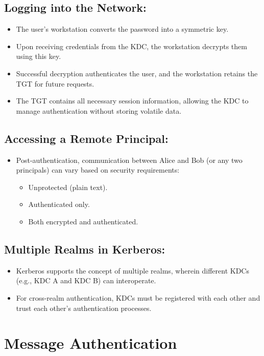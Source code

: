 \documentclass[12pt]{article}
\begin{document}
\subsection*{Logging into the Network:}
\begin{itemize}
    \item The user's workstation converts the password into a symmetric key.
    \item Upon receiving credentials from the KDC, the workstation decrypts them using this key.
    \item Successful decryption authenticates the user, and the workstation retains the TGT for future requests.
    \item The TGT contains all necessary session information, allowing the KDC to manage authentication without storing volatile data.
\end{itemize}

\subsection*{Accessing a Remote Principal:}
\begin{itemize}
    \item Post-authentication, communication between Alice and Bob (or any two principals) can vary based on security requirements:
    \begin{itemize}
        \item Unprotected (plain text).
        \item Authenticated only.
        \item Both encrypted and authenticated.
    \end{itemize}
\end{itemize}

\subsection*{Multiple Realms in Kerberos:}
\begin{itemize}
    \item Kerberos supports the concept of multiple realms, wherein different KDCs (e.g., KDC A and KDC B) can interoperate.
    \item For cross-realm authentication, KDCs must be registered with each other and trust each other's authentication processes.
\end{itemize}

\section*{Message Authentication}
\end{document}
